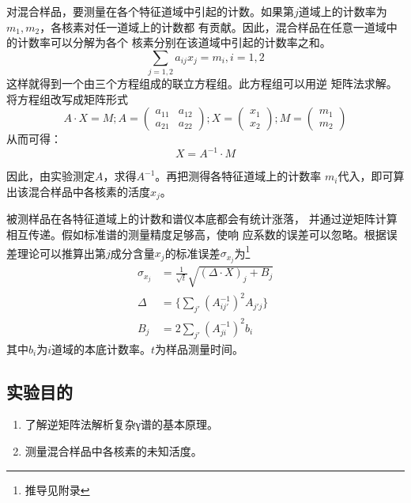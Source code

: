 \documentclass{article}
\begin{document}
    对混合样品，要测量在各个特征道域中引起的计数。如果第$j$道域上的计数率为$m_1,m_2$，各核素对任一道域上的计数都 有贡献。因此，混合样品在任意一道域中的计数率可以分解为各个 核素分别在该道域中引起的计数率之和。
    \begin{equation}
        \sum_{j = 1,2} a_{ij}x_{j} = m_i, i = 1,2 
    \end{equation}
    这样就得到一个由三个方程组成的联立方程组。此方程组可以用逆
    矩阵法求解。将方程组改写成矩阵形式
    \begin{equation}
        A\cdot X = M;A=\begin{pmatrix}
            a_{11}&a_{12}\\a_{21}&a_{22}
        \end{pmatrix};X=\begin{pmatrix}
                x_1\\x_2
            \end{pmatrix};M=\begin{pmatrix}
                m_1\\m_2
            \end{pmatrix}
    \end{equation}
    从而可得：\begin{equation}
        X = A^{-1}\cdot M
    \end{equation}

    因此，由实验测定$A$，求得$A^{-1}$。再把测得各特征道域上的计数率 $m_i$代入，即可算出该混合样品中各核素的活度$x_j$。

    被测样品在各特征道域上的计数和谱仪本底都会有统计涨落， 并通过逆矩阵计算相互传递。假如标准谱的测量精度足够高，使响 应系数的误差可以忽略。根据误差理论可以推算出第$j$成分含量$x_j$的标准误差$\sigma_{x_j}$为\footnote{推导见附录}
    \begin{equation}
        \begin{aligned}
            \sigma_{x_j} &= \frac{1}{\sqrt{t}}\sqrt{(\Delta\cdot X)_j+B_j}\\
            \Delta &= \{\sum_{j'}(A^{-1}_{ij'})^2A_{j'j}\} \\
            B_j &= 2\sum_{j'}(A^{-1}_{ji})^2b_{i} 
        \end{aligned}
    \end{equation}
    其中$b_i$为$i$道域的本底计数率。$t$为样品测量时间。
    \subsection{实验目的}
    \begin{enumerate}
        \item 了解逆矩阵法解析复杂γ谱的基本原理。
        \item 测量混合样品中各核素的未知活度。
    \end{enumerate}
\end{document}

